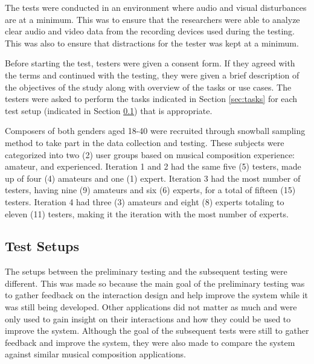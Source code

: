 		The tests were conducted in an environment where audio and visual disturbances are at a minimum. This was to ensure that the researchers were able to analyze clear audio and video data from the recording devices used during the testing. This was also to ensure that distractions for the tester was kept at a minimum.


		Before starting the test, testers were given a consent form. If they agreed with the terms and continued with the testing, they were given a brief description of the objectives of the study along with overview of the tasks or use cases. The testers were asked to perform the tasks indicated in Section \ref{sec:tasks} for each test setup (indicated in Section \ref{sec:test-setups}) that is appropriate. 
		
		Composers of both genders aged 18-40 were recruited through snowball sampling method to take part in the data collection and testing. These subjects were categorized into two (2) user groups based on musical composition experience: amateur, and experienced. Iteration 1 and 2 had the same five (5) testers, made up of four (4) amateurs and one (1) expert. Iteration 3 had the most number of testers, having nine (9) amateurs and six (6) experts, for a total of fifteen (15) testers. Iteration 4 had three (3) amateurs and eight (8) experts totaling to eleven (11) testers, making it the iteration with the most number of experts. 

		\subsection{Test Setups}
		\label{sec:test-setups}

			The setups between the preliminary testing and the subsequent testing were different. This was made so because the main goal of the preliminary testing was to gather feedback on the interaction design and help improve the system while it was still being developed. Other applications did not matter as much and were only used to gain insight on their interactions and how they could be used to improve the system. Although the goal of the subsequent tests were still to gather feedback and improve the system, they were also made to compare the system against similar musical composition applications. 

